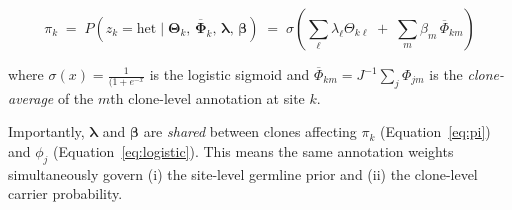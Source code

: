 \documentclass{article}
\begin{document}
\begin{equation}
  \pi_k
  \;=\;
  P\!\left(z_k = \mathrm{het} \mid \boldsymbol{\Theta}_k,\,
  \overline{\boldsymbol{\Phi}}_k,\, \boldsymbol{\lambda},\, \boldsymbol{\beta}\right)
  \;=\;
  \sigma\!\left(
    \sum_\ell \lambda_\ell \Theta_{k\ell}
    \;+\;
    \sum_m \beta_m \,\overline{\Phi}_{km}
  \right)
  \label{eq:pi}
\end{equation}

where $\sigma(x) = \frac{1}{(1 + e^{-x}}$ is the logistic sigmoid and
$\overline{\Phi}_{km} = J^{-1}\sum_j \Phi_{jm}$ is the \emph{clone-average}
of the $m$th clone-level annotation at site $k$.


Importantly, $\boldsymbol{\lambda}$ and $\boldsymbol{\beta}$ are
\emph{shared} between clones affecting $\pi_k$ (Equation~\ref{eq:pi}) and $\phi_j$
(Equation~\ref{eq:logistic}). This means the same annotation weights
simultaneously govern (i) the site-level germline prior and (ii) the
clone-level carrier probability.
\end{document}

